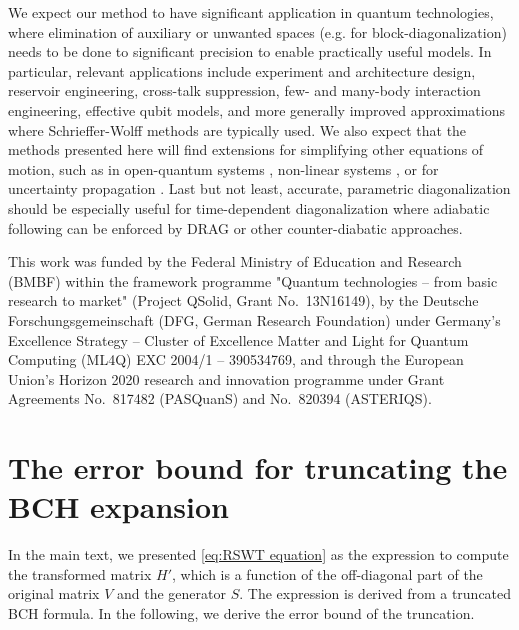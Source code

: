 \documentclass[%
 reprint,
 amsmath,amssymb,
 aps,
pra,
noeprint,
superscriptaddress,
]{revtex4-2}
\begin{document}
We expect our method to have significant application in quantum technologies, where elimination of auxiliary or unwanted spaces (e.g. for block-diagonalization) needs to be done to significant precision to enable practically useful models. In particular, relevant applications include experiment and architecture design, reservoir engineering, cross-talk suppression, few- and many-body interaction engineering, effective qubit models, and more generally improved approximations where Schrieffer-Wolff methods are typically used. We also expect that the methods presented here will find extensions for simplifying other equations of motion, such as in open-quantum systems \cite{de2017dynamics,schirmer2010stabilizing}, non-linear systems \cite{antoine2013computational}, or for uncertainty propagation \cite{dalgaard2022dynamical}. Last but not least, accurate, parametric diagonalization should be especially useful for time-dependent diagonalization where adiabatic following can be enforced by DRAG \cite{Theis2018, Motzoi2009} or other counter-diabatic \cite{Guery2019, unanyan1997laser} approaches.



\begin{acknowledgments}
This work was funded by the Federal Ministry of Education and
Research (BMBF) within the framework programme "Quantum technologies – from
basic research to market" (Project QSolid, Grant No.~13N16149),
by the Deutsche Forschungsgemeinschaft (DFG, German Research Foundation) under Germany’s
Excellence Strategy – Cluster of Excellence Matter and
Light for Quantum Computing (ML4Q) EXC 2004/1 –
390534769, and through the European Union’s Horizon
2020 research and innovation programme under Grant
Agreements No.~817482 (PASQuanS) and No.~820394
(ASTERIQS).
\end{acknowledgments}



\appendix
\section{The error bound for truncating the BCH expansion}
\label{sec:RSWT error bound}
In the main text, we presented \cref{eq:RSWT equation} as the expression to compute the transformed matrix $H'$, which is a function of the off-diagonal part of the original matrix $V$ and the generator $S$.
The expression is derived from a truncated BCH formula.
In the following, we derive the error bound of the truncation.
\end{document}
